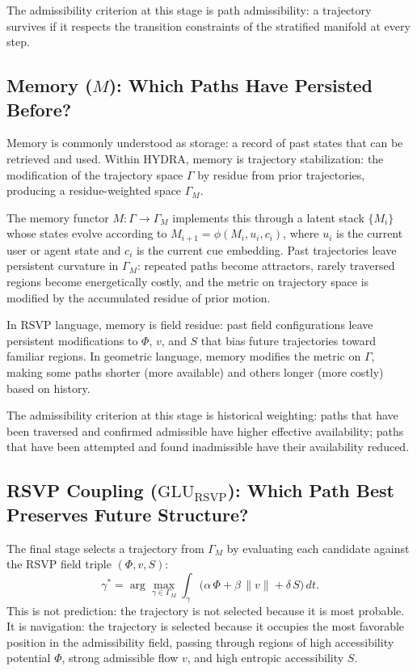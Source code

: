 \documentclass[12pt, oneside]{book}
\theoremstyle{flyxion}
\theoremstyle{definition}
\begin{document}
The admissibility criterion at this stage is path admissibility: a
trajectory survives if it respects the transition constraints of the
stratified manifold at every step.

\subsection{Memory ($M$): Which Paths Have Persisted Before?}

Memory is commonly understood as storage: a record of past states that
can be retrieved and used. Within HYDRA, memory is trajectory
stabilization: the modification of the trajectory space $\Gamma$ by
residue from prior trajectories, producing a residue-weighted space
$\Gamma_M$.

The memory functor $M : \Gamma \to \Gamma_M$ implements this through
a latent stack $\{M_i\}$ whose states evolve according to
$M_{i+1} = \phi(M_i, u_i, c_i)$, where $u_i$ is the current
user or agent state and $c_i$ is the current cue embedding. Past
trajectories leave persistent curvature in $\Gamma_M$: repeated paths
become attractors, rarely traversed regions become energetically
costly, and the metric on trajectory space is modified by the
accumulated residue of prior motion.

In RSVP language, memory is field residue: past field configurations
leave persistent modifications to $\Phi$, $v$, and $S$ that bias
future trajectories toward familiar regions. In geometric language,
memory modifies the metric on $\Gamma$, making some paths shorter
(more available) and others longer (more costly) based on history.

The admissibility criterion at this stage is historical weighting:
paths that have been traversed and confirmed admissible have higher
effective availability; paths that have been attempted and found
inadmissible have their availability reduced.

\subsection{RSVP Coupling ($\mathrm{GLU}_\mathrm{RSVP}$): Which Path
             Best Preserves Future Structure?}

The final stage selects a trajectory from $\Gamma_M$ by evaluating
each candidate against the RSVP field triple $(\Phi, v, S)$:
\[
\gamma^* = \arg\max_{\gamma \in \Gamma_M}
\int_\gamma \bigl(\alpha\,\Phi + \beta\,\|v\| + \delta\,S\bigr)\,dt.
\]
This is not prediction: the trajectory is not selected because it is
most probable. It is navigation: the trajectory is selected because
it occupies the most favorable position in the admissibility field,
passing through regions of high accessibility potential $\Phi$,
strong admissible flow $v$, and high entropic accessibility $S$.
\end{document}
